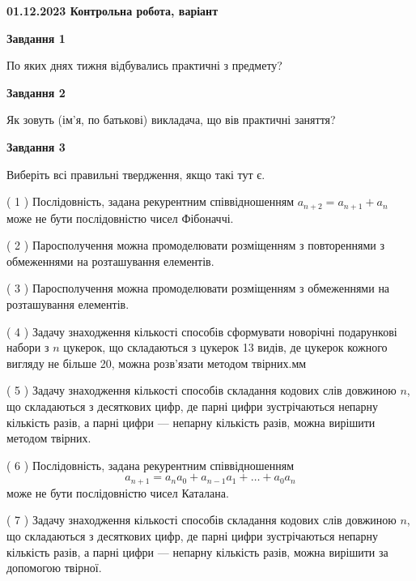 \documentclass[12pt, ukrainian]{article}
\begin{document}
\begin {large}

\textbf{01.12.2023 Контрольна робота, варіант  }\par


{
{\begin {center}\textbf{Завдання 1}\end {center}}\par
По яких днях тижня відбувались практичні з предмету?\par
{\begin {center}\textbf{Завдання 2}\end {center}}\par
Як зовуть (ім'я, по батькові) викладача, що вів практичні заняття?\par
{\begin {center}\textbf{Завдання 3}\end {center}}\par
Виберіть всі правильні твердження, якщо такі тут є.\par
\vspace{2mm}
( 1 ) Послідовність, задана рекурентним співвідношенням $a_{n+2}=a_{n+1}+a_{n}$ може не бути послідовністю чисел Фібоначчі.%

( 2 ) Паросполучення можна промоделювати розміщенням з повтореннями з обмеженнями на розташування елементів.%

( 3 ) Паросполучення можна промоделювати розміщенням з обмеженнями на розташування елементів.%

( 4 ) Задачу знаходження кількості способів сформувати новорічні подарункові набори з $n$ цукерок, що складаються з цукерок 13 видів, де цукерок кожного вигляду не більше 20, можна розв’язати методом твірних.мм%

( 5 ) Задачу знаходження кількості способів складання кодових слів довжиною $n$, що складаються з десяткових цифр, де парні цифри зустрічаються непарну кількість разів, а парні цифри — непарну кількість разів, можна вирішити методом твірних.%

( 6 ) Послідовність, задана рекурентним співвідношенням $$a_{n+1}=a_{n}a_{0}+a_{n-1}a_{1}+\ldots+a_0a_{n}$$ може не бути послідовністю чисел Каталана.%

( 7 ) Задачу знаходження кількості способів складання кодових слів довжиною $n$, що складаються з десяткових цифр, де парні цифри зустрічаються непарну кількість разів, а парні цифри — непарну кількість разів, можна вирішити за допомогою твірної.%

}
\end{large}
\end{document}
